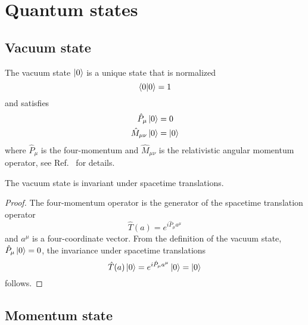 \section{Quantum states}

\subsection{Vacuum state}

\begin{definition}
	The vacuum state $\ket{0}$ is a unique state that is normalized
	\begin{equation}
		\braket{0}
		=
		1
	\end{equation}
	and satisfies
	\begin{align}
		\hat{P}_\mu
		\ket{0}
		&=
		0
		\\
		\hat{M}_{\mu\nu}
		\ket{0}
		&=
		\ket{0}
	\end{align}
	where $\hat{P}_\mu$ is the four-momentum and $\hat{M}_{\mu\nu}$ is the relativistic angular momentum operator, see Ref.~\cite[p.~270]{Greiner2013} for details.
\end{definition}
\begin{lemma}
	The vacuum state is invariant under spacetime translations.
\end{lemma}
\begin{proof}
	The four-momentum operator is the generator of the spacetime translation operator
	\begin{equation}
		\hat{T}(a)
		=
		e^{i\hat{P}_\mu a^\mu}
	\end{equation}
	and $a^\mu$ is a four-coordinate vector.
	From the definition of the vacuum state, $\hat{P}_\mu\ket{0}=0$, the invariance under spacetime translations
	\begin{equation}
		\hat{T}(a)
		\ket{0}
		=
		e^{i\hat{P}_\mu a^\mu}
		\ket{0}
		=
		\ket{0}
	\end{equation}
	follows.
\end{proof}

\subsection{Momentum state}

